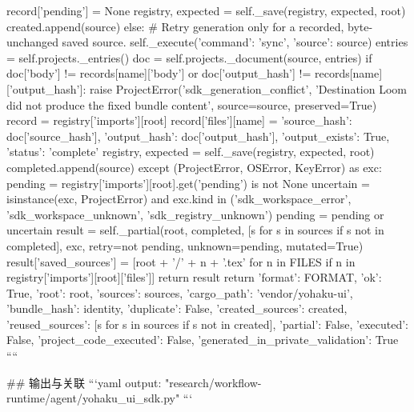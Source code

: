                     record['pending'] = None
                    registry, expected = self._save(registry, expected, root)
                    created.append(source)
                else:
                    # Retry generation only for a recorded, byte-unchanged saved source.
                    self._execute({'command': 'sync', 'source': source})
                entries = self.projects._entries()
                doc = self.projects._document(source, entries)
                if doc['body'] != records[name]['body'] or doc['output_hash'] != records[name]['output_hash']:
                    raise ProjectError('sdk_generation_conflict', 'Destination Loom did not produce the fixed bundle content', source=source, preserved=True)
                record = registry['imports'][root]
                record['files'][name] = {'source_hash': doc['source_hash'], 'output_hash': doc['output_hash'], 'output_exists': True, 'status': 'complete'}
                registry, expected = self._save(registry, expected, root)
                completed.append(source)
            except (ProjectError, OSError, KeyError) as exc:
                pending = registry['imports'][root].get('pending') is not None
                uncertain = isinstance(exc, ProjectError) and exc.kind in ('sdk_workspace_error', 'sdk_workspace_unknown', 'sdk_registry_unknown')
                pending = pending or uncertain
                result = self._partial(root, completed, [s for s in sources if s not in completed], exc,
                                       retry=not pending, unknown=pending, mutated=True)
                result['saved_sources'] = [root + '/' + n + '.tex' for n in FILES if n in registry['imports'][root]['files']]
                return result
        return {'format': FORMAT, 'ok': True, 'root': root, 'sources': sources,
                'cargo_path': 'vendor/yohaku-ui', 'bundle_hash': identity, 'duplicate': False,
                'created_sources': created, 'reused_sources': [s for s in sources if s not in created],
                'partial': False, 'executed': False, 'project_code_executed': False,
                'generated_in_private_validation': True}
````

## 输出与关联
```yaml
output: "research/workflow-runtime/agent/yohaku_ui_sdk.py"
```
